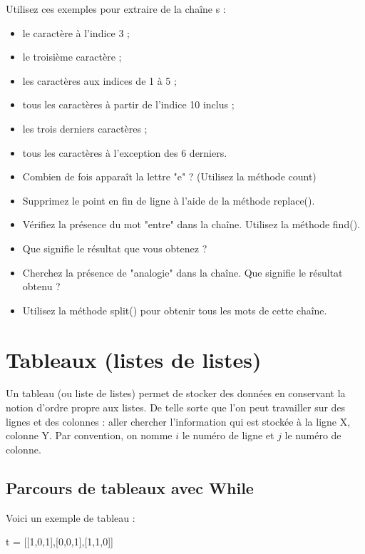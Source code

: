  Utilisez ces exemples pour extraire de la chaîne s :
\begin{itemize}
  \item le caractère à l'indice 3 ;
  \item le troisième caractère ;
  \item les caractères aux indices de 1 à 5 ;
  \item tous les caractères à partir de l'indice 10 inclus ;
  \item les trois derniers caractères ;
  \item tous les caractères à l'exception des 6 derniers.
\end{itemize}


\begin{itemize}
  \item Combien de fois apparaît la lettre "e" ? (Utilisez la méthode count)
  \item Supprimez le point en fin de ligne à l'aide de la méthode replace().
  \item Vérifiez la présence du mot "entre" dans la chaîne. Utilisez la méthode find().
  \item Que signifie le résultat que vous obtenez ?
  \item Cherchez la présence de "analogie" dans la chaîne. Que signifie le résultat obtenu ?
  \item Utilisez la méthode split() pour obtenir tous les mots de cette chaîne.
\end{itemize}

\section{Tableaux (listes de listes)}
Un tableau (ou liste de listes) permet de stocker des données en conservant la notion d'ordre propre aux listes.
De telle sorte que l'on peut travailler sur des lignes et des colonnes : aller chercher l'information qui est stockée à la ligne X, colonne Y. Par convention, on nomme $i$ le numéro de ligne et $j$ le numéro de colonne.

\subsection{Parcours de tableaux avec While}

\exer
Voici un exemple de tableau :

\begin{python}
t = [[1,0,1],[0,0,1],[1,1,0]]
\end{python}

